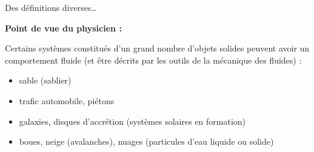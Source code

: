 \begin{frame}{Des définitions diverses\ldots} 

\small

\textbf{Point de vue du physicien :} \bigskip

Certains systèmes constitués d'un grand nombre d'objets solides peuvent avoir un 
comportement fluide (et être décrits par les outils de la mécanique des fluides) :

\pause

\medskip

\begin{itemize}[<+-| alert@+>]
\item
	sable (sablier)

\item
	trafic automobile, piétons	
\item
	galaxies, disques d'accrétion (systèmes solaires en formation)
\item
	boues, neige (avalanches), nuages (particules d'eau liquide ou solide)
\end{itemize}

\end{frame}


